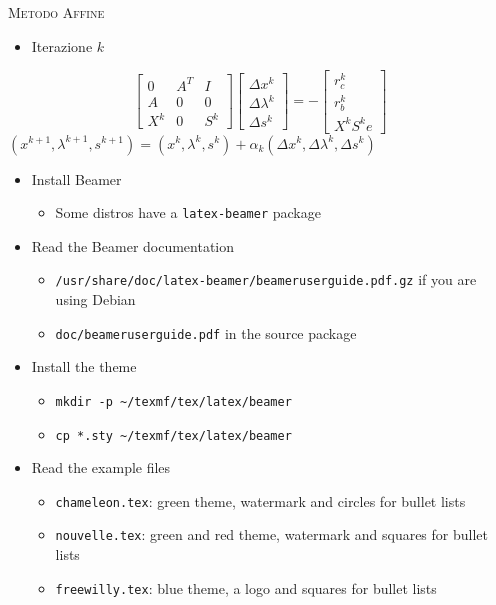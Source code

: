 
\begin{frame}[t]{\textsc{\LARGE Metodo Affine}}
\begin{itemize}
	\item Iterazione $k$
\end{itemize}
\begin{equation*}	
\begin{bmatrix}
0&A^{T}&I \\A& 0&0\\X^{k}&0&S^{k}
\end{bmatrix}\begin{bmatrix}
\Delta x^{k}\\\Delta\lambda^{k} \\\Delta s^{k}
\end{bmatrix}=-\begin{bmatrix}
r_{c}^{k}\\r_{b}^{k}\\X^{k}S^{k}e
\end{bmatrix}
\end{equation*}
$(x^{k+1}, \lambda^{k+1}, s^{k+1}) = (x^{k}, \lambda^{k}, s^{k})+ \alpha_{k}(\Delta x^{k}, \Delta\lambda^{k}, \Delta s^{k})$
\end{frame}

\begin{frame}
\begin{itemize}
\item Install Beamer
  \begin{itemize}
  \item Some distros have a \verb!latex-beamer! package
  \end{itemize}
\item Read the Beamer documentation
  \begin{itemize}
  \item \verb!/usr/share/doc/latex-beamer/beameruserguide.pdf.gz! if you are
        using Debian
  \item \verb!doc/beameruserguide.pdf! in the source package
  \end{itemize}
\item Install the theme
  \begin{itemize}
  \item \verb!mkdir -p ~/texmf/tex/latex/beamer!\\
  \item \verb!cp *.sty ~/texmf/tex/latex/beamer!
  \end{itemize}
\item Read the example files
  \begin{itemize}
  \item \verb!chameleon.tex!: green theme, watermark and circles for bullet
        lists
  \item \verb!nouvelle.tex!: green and red theme, watermark and squares for
        bullet lists
  \item \verb!freewilly.tex!: blue theme, a logo and squares for bullet lists
  \end{itemize}
\end{itemize}
\end{frame}

